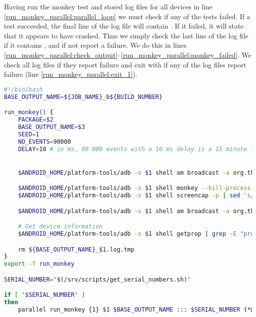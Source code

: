 Having run the monkey test and stored log files for all devices in line \ref{run_monkey_parallel:parallel_loop} we must check if any of the tests failed. If a test succeeded, the final line of the log file will contain . If it failed, it will state that it appears to have crashed. Thus we simply check the last line of the log file if it contains , and if not report a failure. We do this in lines \ref{run_monkey_parallel:check_output}--\ref{run_monkey_parallel:monkey_failed}. We check all log files if they report failure and exit with  if any of the log files report failure (line \ref{run_monkey_parallel:exit_1}).

\begin{lstlisting}[language=bash,caption=Script that runs monkey tests on all connected devices in parallel,label=lst:run_monkey_parallel]
#!/bin/bash
BASE_OUTPUT_NAME=${JOB_NAME}_b${BUILD_NUMBER}

run_monkey() {
    PACKAGE=$2
    BASE_OUTPUT_NAME=$3
    SEED=1
    NO_EVENTS=90000
    DELAY=10 # in ms. 90 000 events with a 10 ms delay is a 15 minute test.


    $ANDROID_HOME/platform-tools/adb -s $1 shell am broadcast -a org.thisisafactory.simiasque.SET_OVERLAY --ez enable true(*@\label{run_monkey_parallel:go_away_monkey_true}@*)

    $ANDROID_HOME/platform-tools/adb -s $1 shell monkey --kill-process-after-error -v -v -s $SEED --throttle $DELAY -p $PACKAGE $NO_EVENTS > ${BASE_OUTPUT_NAME}_$1.log.tmp (*@\label{run_monkey_parallel:run_monkey_test}@*)
    $ANDROID_HOME/platform-tools/adb -s $1 shell screencap -p | sed 's/\r$//' > ${BASE_OUTPUT_NAME}_$1.png (*@\label{run_monkey_parallel:screenshot}@*)

    $ANDROID_HOME/platform-tools/adb -s $1 shell am broadcast -a org.thisisafactory.simiasque.SET_OVERLAY --ez enable false(*@\label{run_monkey_parallel:go_away_monkey_false}@*)

    # Get device information
    $ANDROID_HOME/platform-tools/adb -s $1 shell getprop | grep -E "product|sdk|serial" | grep -v ro.boot | cat - ${BASE_OUTPUT_NAME}_$1.log.tmp > ${BASE_OUTPUT_NAME}_$1.log (*@\label{run_monkey_parallel:device_info}@*)

    rm ${BASE_OUTPUT_NAME}_$1.log.tmp
}
export -f run_monkey

SERIAL_NUMBER="$(/srv/scripts/get_serial_numbers.sh)"

if [ "$SERIAL_NUMBER" ]
then
    parallel run_monkey {1} $1 $BASE_OUTPUT_NAME ::: $SERIAL_NUMBER (*@\label{run_monkey_parallel:parallel_loop}@*)


\end{lstlisting}
